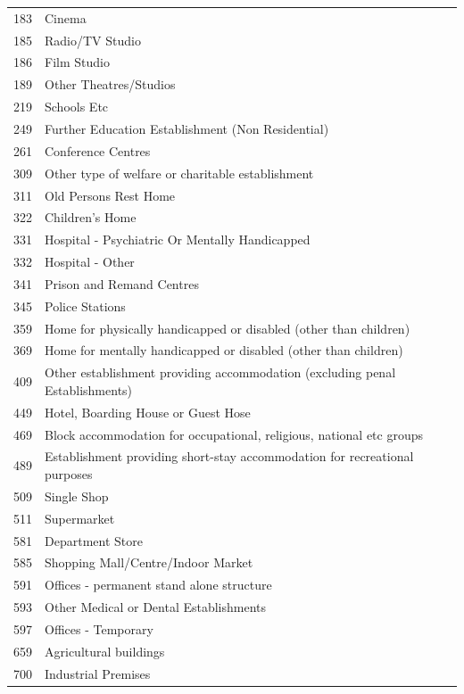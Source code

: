 \documentclass[table,a4paper,oneside]{book}
\begin{document}
\begin{singlespace}
\begin{longtable}{|l|p{11cm}|}
183	&Cinema	\\
\rowcolor{lightgray} 185	&Radio/TV Studio	\\
186	&Film Studio	\\
\rowcolor{lightgray} 189	&Other Theatres/Studios	\\
219	&Schools Etc	\\
\rowcolor{lightgray} 249	&Further Education Establishment (Non Residential)	\\
261	&Conference Centres	\\
\rowcolor{lightgray} 309	&Other type of welfare or charitable establishment	\\
311	&Old Persons Rest Home	\\
\rowcolor{lightgray} 322	&Children's Home	\\
331	&Hospital - Psychiatric Or Mentally Handicapped	\\
\rowcolor{lightgray} 332	&Hospital - Other	\\
341	&Prison and Remand Centres	\\
\rowcolor{lightgray} 345	&Police Stations	\\
359	&Home for physically handicapped or disabled (other than children)	\\
\rowcolor{lightgray} 369	&Home for mentally handicapped or disabled (other than children)	\\
409	&Other establishment providing accommodation (excluding penal Establishments)	\\
\rowcolor{lightgray} 449	&Hotel, Boarding House or Guest Hose	\\
469	&Block accommodation for occupational, religious, national etc groups	\\
\rowcolor{lightgray} 489	&Establishment providing short-stay accommodation for recreational purposes	\\
509	&Single Shop	\\
\rowcolor{lightgray} 511	&Supermarket	\\
581	&Department Store	\\
\rowcolor{lightgray} 585	&Shopping Mall/Centre/Indoor Market	\\
591	&Offices - permanent stand alone structure	\\
\rowcolor{lightgray} 593	&Other Medical or Dental Establishments	\\
597	&Offices - Temporary	\\
\rowcolor{lightgray} 659	&Agricultural buildings	\\
700	&Industrial Premises	\\

\end{longtable}
\end{singlespace}
\end{document}
